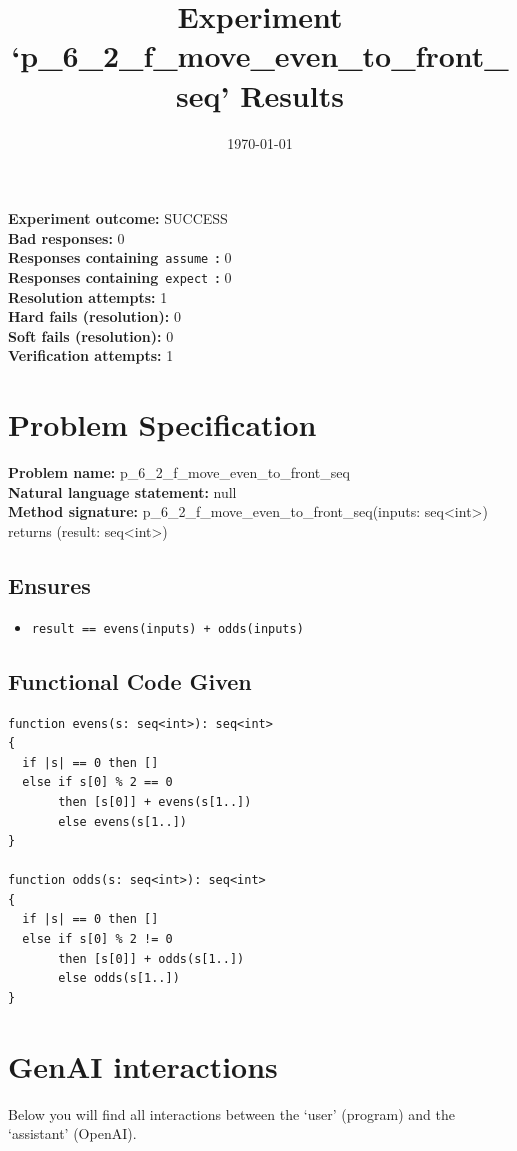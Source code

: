 \documentclass{article}
\begin{document}
\title{Experiment `p\_6\_2\_f\_move\_even\_to\_front\_seq' Results}
\author{\today}
\date{}
\maketitle
\textbf{Experiment outcome: }SUCCESS
\\\textbf{Bad responses: }0
\\\textbf{Responses containing}~\texttt{assume}~\textbf{: }0
\\\textbf{Responses containing}~\texttt{expect}~\textbf{: }0
\\\textbf{Resolution attempts: }1
\\\textbf{Hard fails (resolution): }0
\\\textbf{Soft fails (resolution): }0
\\\textbf{Verification attempts: }1
\section*{Problem Specification}
\textbf{Problem name: }p\_6\_2\_f\_move\_even\_to\_front\_seq
\\\textbf{Natural language statement: }null
\\\textbf{Method signature: }p\_6\_2\_f\_move\_even\_to\_front\_seq(inputs: seq<int>) returns (result: seq<int>)
\subsection*{Ensures}
\begin{itemize}
\item \texttt{result == evens(inputs) + odds(inputs)}
\end{itemize}
\subsection*{Functional Code Given}
\begin{lstlisting}
function evens(s: seq<int>): seq<int>
{
  if |s| == 0 then []
  else if s[0] % 2 == 0
       then [s[0]] + evens(s[1..])
       else evens(s[1..])
}

function odds(s: seq<int>): seq<int>
{
  if |s| == 0 then []
  else if s[0] % 2 != 0
       then [s[0]] + odds(s[1..])
       else odds(s[1..])
}
\end{lstlisting}
\clearpage
\section*{GenAI interactions}
Below you will find all interactions between the `user' (program) and the `assistant' (OpenAI).
\end{document}
